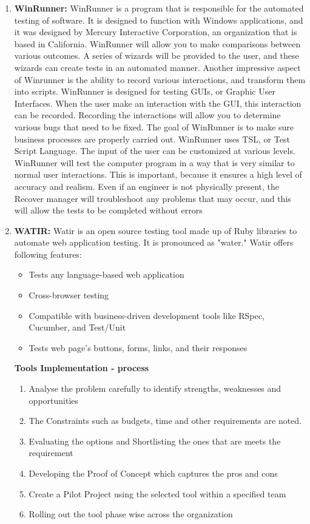 \begin{enumerate}
\item \textbf{WinRunner:}
WinRunner is a program that is responsible for the automated testing of software. It is designed to function with Windows applications, and it was designed by Mercury Interactive Corporation, an organization that is based in California. WinRunner will allow you to make comparisons between various outcomes. 
A series of wizards will be provided to the user, and these wizards can create tests in an automated manner. Another impressive aspect of Winrunner is the ability to record various interactions, and transform them into scripts. WinRunner is designed for testing GUIs, or Graphic User Interfaces.
When the user make an interaction with the GUI, this interaction can be recorded. Recording the interactions will allow you to determine various bugs that need to be fixed. The goal of WinRunner is to make sure business processes are properly carried out. WinRunner uses TSL, or Test Script Language. The input of the user can be customized at various levels. WinRunner will test the computer program in a way that is very similar to normal user interactions. This is important, because it ensures a high level of accuracy and realism. Even if an engineer is not physically present, the Recover manager will troubleshoot any problems that may occur, and this will allow the tests to be completed without errors


\item \textbf{WATIR:}
Watir is an open source testing tool made up of Ruby libraries to automate web application testing. It is pronounced as "water."
Watir offers following features:
\begin{itemize}
\item Tests any language-based web application
\item Cross-browser testing
\item Compatible with business-driven development tools like RSpec, Cucumber, and Test/Unit
\item Tests web page's buttons, forms, links, and their responses
\end{itemize}

\textbf{Tools Implementation - process}
\begin{enumerate}
\item Analyse the problem carefully to identify strengths, weaknesses and opportunities 
\item The Constraints such as budgets, time and other requirements are noted.
\item Evaluating the options and Shortlisting the ones that are meets the requirement
\item Developing the Proof of Concept which captures the pros and cons
\item Create a Pilot Project using the selected tool within a specified team
\item Rolling out the tool phase wise across the organization
\end{enumerate}
\end{enumerate}







